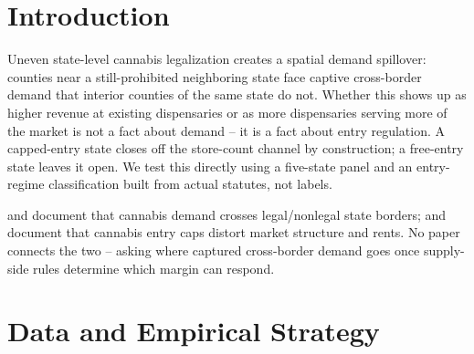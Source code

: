 \documentclass[5p]{elsarticle}
\begin{document}
\section{Introduction}

Uneven state-level cannabis legalization creates a spatial demand spillover: counties near a still-prohibited
neighboring state face captive cross-border demand that interior counties of the same state do not. Whether
this shows up as higher revenue at existing dispensaries or as more dispensaries serving more of the market is
not a fact about demand -- it is a fact about entry regulation. A capped-entry state closes off the
store-count channel by construction; a free-entry state leaves it open. We test this directly using a
five-state panel and an entry-regime classification built from actual statutes, not labels.

\citet{HaoCowan2020} and \citet{HansenMillerWeber2020} document that cannabis demand crosses legal/nonlegal
state borders; \citet{HollenbeckUetake2021} and \citet{Thomas2019LicenseQuotas} document that cannabis entry
caps distort market structure and rents. No paper connects the two -- asking where captured cross-border
demand goes once supply-side rules determine which margin can respond.

\section{Data and Empirical Strategy}
\end{document}
